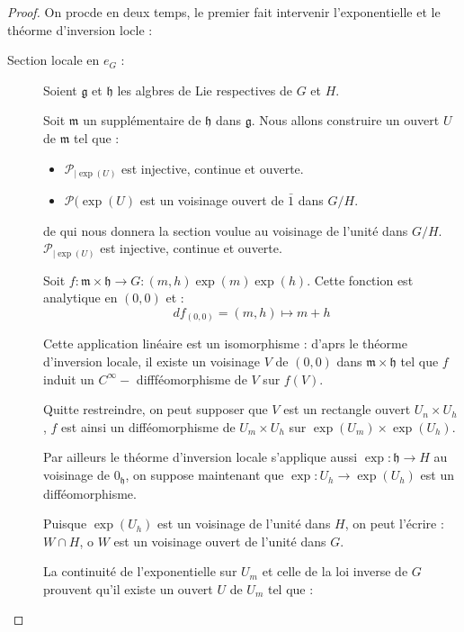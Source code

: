 \begin{proof}
On procde en deux temps, le premier fait intervenir l'exponentielle et le th\'eorme d'inversion locle :

\par
\begin{description}
\item[Section locale en $e_G$ :] Soient $\mathfrak{g}$ et $\mathfrak{h}$ les algbres de Lie respectives de $G$ et $H$.

\par
Soit $\mathfrak{m}$ un suppl\'ementaire de $\mathfrak{h}$ dans $\mathfrak{g}$. %
Nous allons construire un ouvert $U$ de $\mathfrak{m}$ tel que :

\begin{itemize}
\item $\mathcal{P}_{|\exp(U)}$ est injective, continue et ouverte.
\item $\mathcal{P}(\exp(U)$ est un voisinage ouvert de $\bar{1}$ dans $G/H$.
\end{itemize}
de qui nous donnera la section voulue au voisinage de l'unit\'e dans $G/H$.
$\mathcal{P}_{|\exp(U)}$ est injective, continue et ouverte.

\ligneinter
Soit $f:\mathfrak{m}\times\mathfrak{h}\rightarrow G:(m,h)\exp(m)\exp(h)$. Cette fonction est analytique en $(0,0)$ et :
\[df_{(0,0)}=(m,h)\mapsto m+h\]

Cette application lin\'eaire est un isomorphisme : d'aprs le th\'eorme d'inversion locale, %
il existe un voisinage $V$ de $(0,0)$ dans $\mathfrak{m}\times\mathfrak{h}$ tel que $f$ induit un $C^{\infty}-$ difff\'eomorphisme de $V$ sur $f(V)$.

\par
Quitte  restreindre, on peut supposer que $V$ est un rectangle ouvert $U_n\times U_h$, $f$ est ainsi un diff\'eomorphisme de $U_m\times U_h$ sur $\exp(U_m)\times\exp(U_h)$.

\par
Par ailleurs le th\'eorme d'inversion locale s'applique aussi  $\exp :\mathfrak{h}\rightarrow H$ au voisinage de $0_{\mathfrak{h}}$, %
on suppose maintenant que $\exp :U_h\rightarrow \exp(U_h)$ est un diff\'eomorphisme.

\par
Puisque $\exp(U_h)$ est un voisinage de l'unit\'e dans $H$, on peut l'\'ecrire : $W\cap H$, o $W$ est un voisinage ouvert de l'unit\'e dans $G$.

\par
La continuit\'e de l'exponentielle sur $U_m$ et celle de la loi inverse de $G$ prouvent qu'il existe un ouvert $U$ de $U_m$ tel que :


\end{description}
\end{proof}
